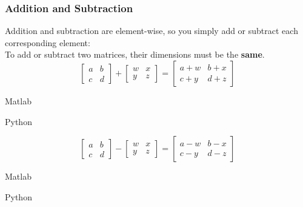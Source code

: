 \subsubsection{Addition and Subtraction}
Addition and subtraction are element-wise, so you simply add or subtract each corresponding element:\\
To add or subtract two matrices, their dimensions must be the \textbf{same}.\\

\begin{equation}
  \left[
    \begin{matrix}
      a & b \\
      c & d
    \end{matrix}
    \right] +
  \left[
    \begin{matrix}
      w & x \\
      y & z
    \end{matrix}
    \right]=
  \left[
    \begin{matrix}
      a+w & b+x \\
      c+y & d+z
    \end{matrix}
    \right]
  \label{eqn:MatrixAddition}
\end{equation}

\begin{multicols}{2}
  Matlab\\
  \columnbreak

  Python\\
  
\end{multicols}

\begin{equation}
  \left[
    \begin{matrix}
      a & b \\
      c & d
    \end{matrix}
    \right] -
  \left[
    \begin{matrix}
      w & x \\
      y & z
    \end{matrix}
    \right]=
  \left[
    \begin{matrix}
      a-w & b-x \\
      c-y & d-z
    \end{matrix}
    \right]
  \label{eqn:MatrixSubtraction}
\end{equation}

\begin{multicols}{2}
  Matlab\\
  \columnbreak

  Python\\
  
\end{multicols}

